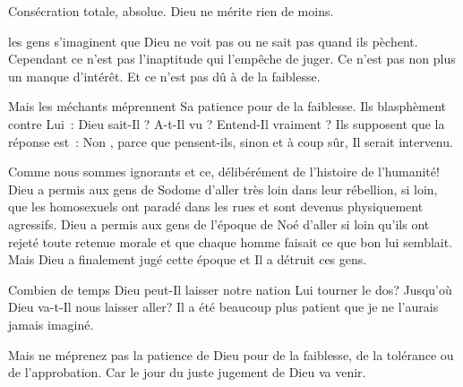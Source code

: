 Consécration totale, absolue. Dieu ne mérite rien de moins. 

\dvrule






 les gens s'imaginent que Dieu ne voit pas
 ou ne sait pas quand ils pèchent.
 Cependant ce n'est pas l'inaptitude qui l'empêche de juger.
 Ce n'est pas non plus un manque d'intérêt.
 Et ce n'est pas dû à de la faiblesse.


Mais les méchants méprennent Sa patience pour de la faiblesse.
 Ils blasphèment contre Lui~:
 \og Dieu sait-Il ? A-t-Il vu ? Entend-Il vraiment ? \fg{}
 Ils supposent que la réponse est~: \og Non \fg{},
 parce que pensent-ils, sinon et à coup sûr, Il serait intervenu.

Comme nous sommes ignorants \ocadr et ce, délibérément \fcadr{}
 de l'histoire de l'humanité!
 Dieu a permis aux gens de Sodome d'aller très loin dans leur rébellion,
 si loin, que les homosexuels ont paradé dans les rues et sont devenus
 physiquement agressifs.
 Dieu a permis aux gens de l'époque de Noé d'aller si loin qu'ils ont
 rejeté toute retenue morale et que chaque homme faisait ce que bon
 lui semblait.
 Mais Dieu a finalement jugé cette époque et Il a détruit ces gens.

Combien de temps Dieu peut-Il laisser notre nation Lui tourner le dos?
 Jusqu'où Dieu va-t-Il nous laisser aller?
 Il a été beaucoup plus patient que je ne l'aurais jamais imaginé.

Mais ne méprenez pas la patience de Dieu pour de la faiblesse,
 de la tolérance ou de l'approbation.
 Car le jour du juste jugement de Dieu va venir.

\dvrule


